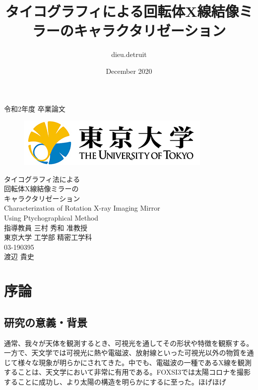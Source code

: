 \documentclass[dvipdfmx,autodetect-engine]{jreport}
\title{タイコグラフィによる回転体X線結像ミラーのキャラクタリゼーション}
\author{dieu.detruit }
\date{December 2020}
\begin{document}
\begin{center}
\thispagestyle{empty}
{\LARGE 令和2年度 卒業論文}\\
\begin{figure}[H]
    \centering
    \includegraphics[scale=0.4]{images/utility/utlogo.jpg}
\end{figure}
\vspace*{2.5cm}
{\Huge タイコグラフィ法による}\\
\vspace*{0.5cm}
{\Huge 回転体X線結像ミラーの}\\
\vspace*{0.5cm}
{\Huge キャラクタリゼーション}\\
\vspace*{1.5cm}
{\huge Characterization of Rotation X-ray Imaging Mirror}\\
\vspace*{0.5cm}
{\huge Using Ptychographical Method}\\
\vspace*{3.5cm}
{\LARGE 指導教員 三村 秀和 准教授}\\
\vspace*{1.0cm}
{\Large 東京大学 工学部 精密工学科}\\
{\Large 03-190395}\\
\vspace*{1.0cm}
{\LARGE 渡辺 貴史}
\end{center}

\newpage
\tableofcontents

\newpage
\chapter{序論}
\section{研究の意義・背景}
通常、我々が天体を観測するとき、可視光を通してその形状や特徴を観察する。一方で、天文学では可視光に熱や電磁波、放射線といった可視光以外の物質を通じて様々な現象が明らかにされてきた。中でも、電磁波の一種であるX線を観測することは、天文学において非常に有用である。FOXSI3では太陽コロナを撮影することに成功し、より太陽の構造を明らかにするに至った。ほげほげ
\end{document}
